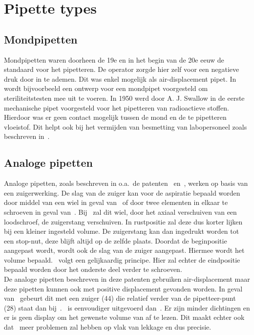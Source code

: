 \section{Pipette types}
\subsection{Mondpipetten}
Mondpipetten waren doorheen de 19e en in het begin van de 20e eeuw de standaard voor het pipetteren. De operator zorgde hier zelf voor een negatieve druk door in te ademen. Dit was enkel mogelijk als air-displacement pipet. In\ \cite{RN21} wordt bijvoorbeeld een ontwerp voor een mondpipet voorgesteld om steriliteitstesten mee uit te voeren. In 1950 werd door A. J. Swallow in\cite{RN18} de eerste mechanische pipet voorgesteld voor het pipetteren van radioactieve stoffen. Hierdoor was er geen contact mogelijk tussen de mond en de te pipetteren vloeistof. Dit helpt ook bij het vermijden van besmetting van labopersoneel zoals beschreven in\ \cite{RN20}.
\subsection{Analoge pipetten}\label{sec: Analoge pipetten}
Analoge pipetten, zoals beschreven in o.a.\ de patenten\ \cite{RN16} en\ \cite{RN17}, werken op basis van een zuigerwerking. De slag van de zuiger kan voor de aspiratie bepaald worden door middel van een wiel in geval van\ \cite{RN17} of door twee elementen in elkaar te schroeven in geval van\ \cite{RN16}. Bij\ \cite{RN17} zal dit wiel, door het axiaal verschuiven van een loodschroef, de zuigerstang verschuiven. In rustpositie zal deze dus korter lijken bij een kleiner ingesteld volume. De zuigerstang kan dan ingedrukt worden tot een stop-nut, deze blijft altijd op de zelfde plaats. Doordat de beginpositie aangepast wordt, wordt ook de slag van de zuiger aangepast. Hiermee wordt het volume bepaald.\ \cite{RN16} volgt een gelijkaardig principe. Hier zal echter de eindpositie bepaald worden door het onderste deel verder te schroeven. 
\\[12pt]De analoge pipetten beschreven in deze patenten gebruiken air-displacement maar deze pipetten kunnen ook met positive displacement gevonden worden. In geval van\ \cite{RN17} gebeurt dit met een zuiger (44) die relatief verder van de pipetteer-punt (28) staat dan bij\ \cite{RN16}.\ \cite{RN16} is eenvoudiger uitgevoerd dan\ \cite{RN17}. Er zijn minder dichtingen en er is geen display om het gewenste volume van af te lezen. Dit maakt echter ook dat\ \cite{RN16} meer problemen zal hebben op vlak van lekkage en dus precisie.
